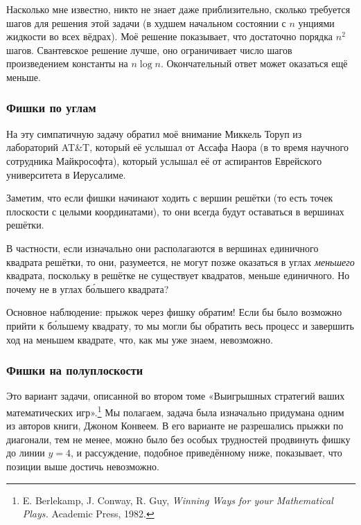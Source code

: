 Насколько мне известно, никто не знает даже приблизительно, сколько требуется шагов для решения этой задачи (в худшем начальном состоянии с $n$ унциями жидкости во всех вёдрах).
Моё решение показывает, что достаточно порядка $n^2$ шагов.
Свантевское  решение лучше, оно ограничивает число шагов произведением константы на $n\log n$.
Окончательный ответ может оказаться ещё меньше.

\subsubsection*{Фишки по углам}%

На эту симпатичную задачу обратил моё внимание Миккель Торуп из лабораторий AT\&T, %
который её услышал от Ассафа Наора %
(в то время научного сотрудника Майкрософта), который услышал её от аспирантов Еврейского университета в Иерусалиме.

\medskip

Заметим, что если фишки начинают ходить с вершин решётки (то есть точек плоскости с целыми координатами), то они всегда будут оставаться в вершинах решётки.

В частности, если изначально они располагаются в вершинах единичного квадрата решётки, то они, разумеется, не могут позже оказаться в углах \emph{меньшего} квадрата, поскольку в решётке не существует квадратов, меньше единичного.
Но почему не в углах б\'{о}льшего квадрата?

Основное наблюдение: прыжок через фишку обратим!
Если бы было возможно прийти к б\'{о}льшему квадрату, то мы могли бы обратить весь процесс и завершить ход на меньшем квадрате, что, как мы уже знаем, невозможно.
\heart

\subsubsection*{Фишки на полуплоскости}%

Это вариант задачи, описанной во втором томе «Выигрышных стратегий ваших математических игр».\footnote{E. Berlekamp, J. Conway, R. Guy,
\emph{Winning Ways for your Mathematical Plays.} Academic Press, 1982.}
Мы полагаем, задача была изначально придумана одним из авторов книги, Джоном Конвеем.
В его варианте не разрешались прыжки по диагонали, тем не менее, можно было без особых трудностей продвинуть фишку до линии $y = 4$, и рассуждение, подобное приведённому ниже, показывает, что позиции выше достичь невозможно.

